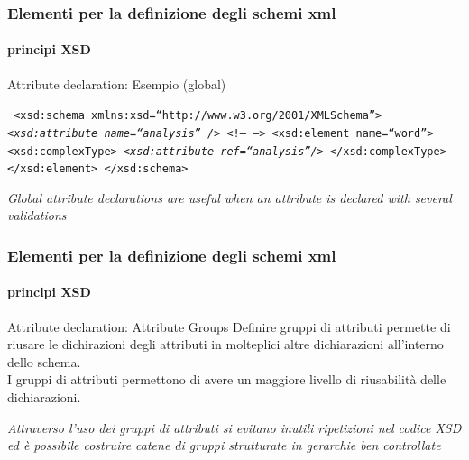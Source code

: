 \begin{frame}
	\frametitle{Elementi per la definizione degli schemi xml}
	\framesubtitle{principi XSD}
	\addtocounter{nframe}{1}

	\begin{block}{Attribute declaration: Esempio (global)}

		\texttt{
			<xsd:schema xmlns:xsd=``http://www.w3.org/2001/XMLSchema''>
			\emph{<xsd:attribute name=``analysis'' />}
			<!-- -->
			<xsd:element name=``word''>
			<xsd:complexType>
			\emph{<xsd:attribute ref=``analysis''/>}
			</xsd:complexType>
			</xsd:element>
			</xsd:schema>
		}

	\end{block}

	\textit{Global attribute declarations are useful when an attribute is declared with several validations}


\end{frame}






\begin{frame}
	\frametitle{Elementi per la definizione degli schemi xml}
	\framesubtitle{principi XSD}
	\addtocounter{nframe}{1}

	\begin{block}{Attribute declaration: Attribute Groups}
		Definire gruppi di attributi permette di riusare le dichirazioni degli attributi in molteplici altre dichiarazioni all'interno dello schema.
		\\I gruppi di attributi permettono di avere un maggiore livello di riusabilità delle dichiarazioni.
	\end{block}

	\textit{Attraverso l'uso dei gruppi di attributi si evitano inutili ripetizioni nel codice XSD ed è possibile costruire catene di gruppi strutturate in gerarchie ben controllate}
\end{frame}


